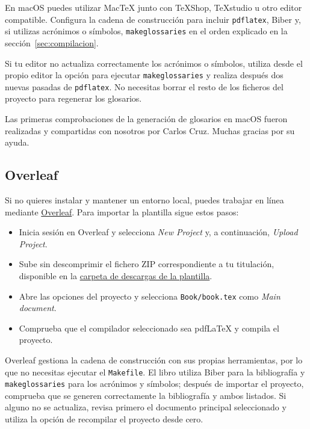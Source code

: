 En macOS puedes utilizar MacTeX junto con TeXShop, TeXstudio u otro editor compatible. Configura la cadena de construcción para incluir \texttt{pdflatex}, Biber y, si utilizas acrónimos o símbolos, \texttt{makeglossaries} en el orden explicado en la sección~\ref{sec:compilacion}.

Si tu editor no actualiza correctamente los acrónimos o símbolos, utiliza desde el propio editor la opción para ejecutar \texttt{makeglossaries} y realiza después dos nuevas pasadas de \texttt{pdflatex}. No necesitas borrar el resto de los ficheros del proyecto para regenerar los glosarios.

Las primeras comprobaciones de la generación de glosarios en macOS fueron realizadas y compartidas con nosotros por Carlos Cruz. Muchas gracias por su ayuda.

\subsection{Overleaf}
\label{sec:compilacion-overleaf}

Si no quieres instalar y mantener un entorno local, puedes trabajar en línea mediante \href{https://www.overleaf.com/}{Overleaf}. Para importar la plantilla sigue estos pasos:

\begin{itemize}
  \item Inicia sesión en Overleaf y selecciona \textit{New Project} y, a continuación, \textit{Upload Project}.
  \item Sube sin descomprimir el fichero ZIP correspondiente a tu titulación, disponible en la \href{https://www.dropbox.com/sh/mm6fwh3ruuuyjz2/AABDUmo7Xj1S968FeJgbmFPva?dl=0}{carpeta de descargas de la plantilla}.
  \item Abre las opciones del proyecto y selecciona \texttt{Book/book.tex} como \textit{Main document}.
  \item Comprueba que el compilador seleccionado sea pdfLaTeX y compila el proyecto.
\end{itemize}

Overleaf gestiona la cadena de construcción con sus propias herramientas, por lo que no necesitas ejecutar el \texttt{Makefile}. El libro utiliza Biber para la bibliografía y \texttt{makeglossaries} para los acrónimos y símbolos; después de importar el proyecto, comprueba que se generen correctamente la bibliografía y ambos listados. Si alguno no se actualiza, revisa primero el documento principal seleccionado y utiliza la opción de recompilar el proyecto desde cero.

